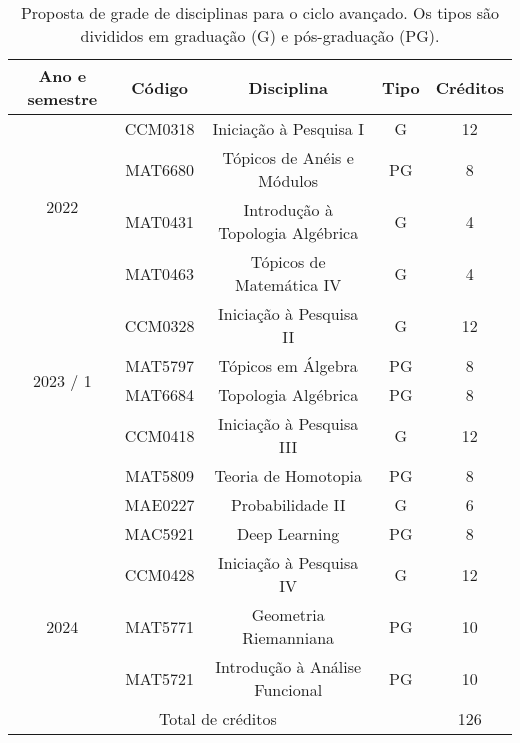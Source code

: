 \documentclass[11pt,reqno]{amsart}
\theoremstyle{definition}
\begin{document}
\begin{table}[h!]\label{tab:disc}
  \centering
  \caption{Proposta de grade de disciplinas para o ciclo avançado. Os tipos são
    divididos em graduação (G) e pós-graduação (PG).}
  \begin{tabular}{ |c|c|c|c|c| }
    \hline
    Ano e semestre & Código & Disciplina & Tipo & Créditos \\
    \hline

    \multirow{4}{*}{2022} & CCM0318 & Iniciação à Pesquisa I & G & 12 \\
                   & MAT6680 & Tópicos de Anéis e Módulos & PG & 8 \\
                   & MAT0431 & Introdução à Topologia Algébrica & G & 4 \\
                   & MAT0463 & Tópicos de Matemática IV & G & 4 \\
    \hline

    \multirow{4}{*}{2023 / 1} & CCM0328 & Iniciação à Pesquisa II & G & 12 \\
                   & MAT5797  & Tópicos em Álgebra & PG & 8 \\
                   & MAT6684 & Topologia Algébrica & PG & 8 \\
    \hline

    \multirow{4}{*}{2023 / 2} & CCM0418 & Iniciação à Pesquisa III & G & 12 \\
                   & MAT5809 & Teoria de Homotopia & PG & 8 \\
                   & MAE0227 & Probabilidade II & G & 6 \\
                   & MAC5921 & Deep Learning & PG & 8 \\
    \hline

    \multirow{3}{*}{2024} & CCM0428 & Iniciação à Pesquisa IV & G & 12 \\
                   & MAT5771 & Geometria Riemanniana & PG & 10 \\
                   & MAT5721 & Introdução à Análise Funcional & PG & 10 \\
    \hline

    \multicolumn{4}{|c|}{Total de créditos} & 126 \\
    \hline
\end{tabular}
\end{table}
\end{document}
